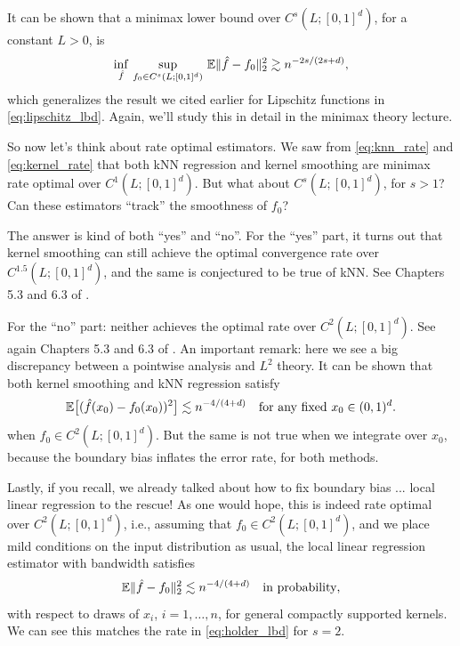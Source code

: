 \documentclass{article}
\begin{document}
It can be shown that a minimax lower bound over $C^s(L; [0,1]^d)$, for a
constant $L>0$, is    
\begin{equation}
\label{eq:holder_lbd}
\inf_{\hat{f}} \, \sup_{f_0 \in C^s(L; [0,1]^d)} \, \mathbb{E}\|\hat{f} - f_0\|_2^2   
\gtrsim n^{-2s/(2s+d)},
\end{equation}
which generalizes the result we cited earlier for Lipschitz functions in
\eqref{eq:lipschitz_lbd}. Again, we'll study this in detail in the minimax
theory lecture. 


So now let's think about rate optimal estimators. We saw from
\eqref{eq:knn_rate} and \eqref{eq:kernel_rate} that both kNN regression and
kernel smoothing are minimax rate optimal over $C^1(L; [0,1]^d)$. But what about
$C^s(L; [0,1]^d)$, for $s>1$? Can these estimators ``track'' the smoothness of
$f_0$? 

The answer is kind of both ``yes'' and ``no''. For the ``yes'' part, it turns
out that kernel smoothing can still achieve the optimal convergence rate over   
$C^{1.5}(L; [0,1]^d)$, and the same is conjectured to be true of kNN. See
Chapters 5.3 and 6.3 of \citet{gyorfi2002distribution}.

For the ``no'' part: neither achieves the optimal rate over $C^2(L;
[0,1]^d)$. See again Chapters 5.3 and 6.3 of \citet{gyorfi2002distribution}. An
important remark: here we see a big discrepancy between a pointwise analysis and
$L^2$ theory. It can be shown that both kernel smoothing and kNN regression
satisfy   
\[
\mathbb{E}\big[ (\hat{f}(x_0) - f_0(x_0))^2 \big] \lesssim n^{-4/(4+d)} \quad \text{for any
  fixed $x_0 \in (0,1)^d$}.   
\]
when $f_0 \in C^2(L; [0,1]^d)$. But the same is not true when we integrate over
$x_0$, because the boundary bias inflates the error rate, for both methods.  

Lastly, if you recall, we already talked about how to fix boundary bias ... 
local linear regression to the rescue! As one would hope, this is indeed rate
optimal over $C^2(L; [0,1]^d)$, i.e., assuming that $f_0 \in C^2(L; [0,1]^d)$,
and we place mild conditions on the input distribution as usual, the local
linear regression estimator with bandwidth  
satisfies      
\begin{equation}
\label{eq:kernel_rate}
\mathbb{E}\|\hat{f} - f_0\|_2^2 \lesssim n^{-4/(4+d)} \quad \text{in probability},
\end{equation}
with respect to draws of $x_i$, $i=1,\dots,n$, for general compactly supported
kernels. We can see this matches the rate in \eqref{eq:holder_lbd} for $s=2$.  
\end{document}
